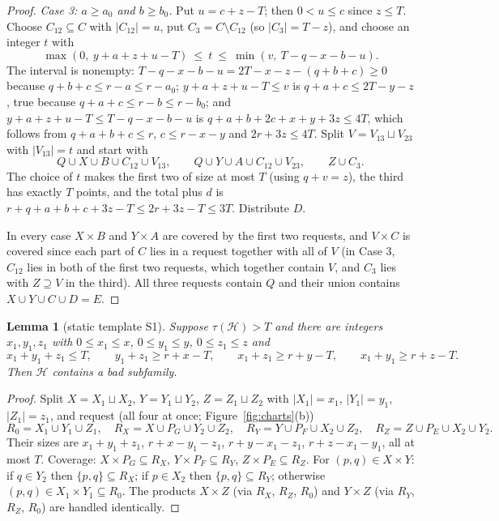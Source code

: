 \documentclass[11pt]{amsart}
\newtheorem{lemma}[theorem]{Lemma}
\theoremstyle{definition}
\theoremstyle{remark}
\newcommand{\cH}{\mathcal H}
\begin{document}
\begin{proof}
\emph{Case 3: $a\ge a_0$ and $b\ge b_0$.} Put $u=c+z-T$; then $0<u\le c$ since $z\le T$. Choose $C_{12}\subseteq C$ with $|C_{12}|=u$, put $C_3=C\setminus C_{12}$ (so $|C_3|=T-z$), and choose an integer $t$ with
\[
\max(0,\ y+a+z+u-T)\ \le\ t\ \le\ \min(v,\ T-q-x-b-u).
\]
The interval is nonempty: $T-q-x-b-u=2T-x-z-(q+b+c)\ge0$ because $q+b+c\le r-a\le r-a_0$; $y+a+z+u-T\le v$ is $q+a+c\le 2T-y-z$, true because $q+a+c\le r-b\le r-b_0$; and $y+a+z+u-T\le T-q-x-b-u$ is $q+a+b+2c+x+y+3z\le4T$, which follows from $q+a+b+c\le r$, $c\le r-x-y$ and $2r+3z\le4T$. Split $V=V_{13}\sqcup V_{23}$ with $|V_{13}|=t$ and start with
\[
Q\cup X\cup B\cup C_{12}\cup V_{13},\qquad Q\cup Y\cup A\cup C_{12}\cup V_{23},\qquad Z\cup C_3 .
\]
The choice of $t$ makes the first two of size at most $T$ (using $q+v=z$), the third has exactly $T$ points, and the total plus $d$ is $r+q+a+b+c+3z-T\le 2r+3z-T\le 3T$. Distribute $D$.

In every case $X\times B$ and $Y\times A$ are covered by the first two requests, and $V\times C$ is covered since each part of $C$ lies in a request together with all of $V$ (in Case 3, $C_{12}$ lies in both of the first two requests, which together contain $V$, and $C_3$ lies with $Z\supseteq V$ in the third). All three requests contain $Q$ and their union contains $X\cup Y\cup C\cup D=E$.
\end{proof}

\begin{lemma}[static template S1]\label{lem:S1}
Suppose $\tau(\cH)>T$ and there are integers $x_1,y_1,z_1$ with $0\le x_1\le x$, $0\le y_1\le y$, $0\le z_1\le z$ and
\[
x_1+y_1+z_1\le T,\qquad y_1+z_1\ge r+x-T,\qquad x_1+z_1\ge r+y-T,\qquad x_1+y_1\ge r+z-T.
\]
Then $\cH$ contains a bad subfamily.
\end{lemma}
\begin{proof}
Split $X=X_1\sqcup X_2$, $Y=Y_1\sqcup Y_2$, $Z=Z_1\sqcup Z_2$ with $|X_1|=x_1$, $|Y_1|=y_1$, $|Z_1|=z_1$, and request (all four at once; Figure~\ref{fig:charts}(b))
\[
R_0=X_1\cup Y_1\cup Z_1,\quad R_X=X\cup P_G\cup Y_2\cup Z_2,\quad R_Y=Y\cup P_F\cup X_2\cup Z_2,\quad R_Z=Z\cup P_E\cup X_2\cup Y_2 .
\]
Their sizes are $x_1+y_1+z_1$, $r+x-y_1-z_1$, $r+y-x_1-z_1$, $r+z-x_1-y_1$, all at most $T$. Coverage: $X\times P_G\subseteq R_X$, $Y\times P_F\subseteq R_Y$, $Z\times P_E\subseteq R_Z$. For $(p,q)\in X\times Y$: if $q\in Y_2$ then $\{p,q\}\subseteq R_X$; if $p\in X_2$ then $\{p,q\}\subseteq R_Y$; otherwise $(p,q)\in X_1\times Y_1\subseteq R_0$. The products $X\times Z$ (via $R_X$, $R_Z$, $R_0$) and $Y\times Z$ (via $R_Y$, $R_Z$, $R_0$) are handled identically.
\end{proof}
\end{document}
